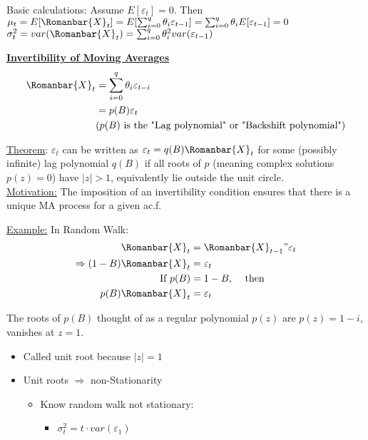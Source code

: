 Basic calculations: Assume $E[\varepsilon_t]=0$. Then $\mu_t=E[\Romanbar{X}_t]=E[\sum_{i=0}^q \theta_i \varepsilon_{t-1}]=\sum_{i=0}^q \theta_i E[\varepsilon_{t-1}]=0 $\\
$\sigma^2_t=var(\Romanbar{X}_t)=\sum_{i=0}^q \theta_i^2 var(\varepsilon_{t-1}) $

\bigskip
\textbf{\underline{Invertibility of Moving Averages}}
\begin{align*}
    \Romanbar{X}_t&= \sum_{i=0}^q \theta_i\varepsilon_{t-i}\\
    &=p(B)\varepsilon_t\\
    &\text{($p(B)$ is the "Lag polynomial" or "Backshift polynomial")}
\end{align*}

\underline{Theorem}: \quad $\varepsilon_t$ can be written as $\varepsilon_t=q(B)\Romanbar{X}_t$ for some (possibly infinite) lag polynomial $q(B)$ if all roots of $p$ (meaning complex solutions $p(z)=0$) have $|z|>1$, equivalently lie outside the unit circle. \\

\underline{Motivation:} \quad The imposition of an invertibility condition ensures that there is a unique MA process for a given ac.f.

\underline{Example:} \quad In Random Walk:
\begin{align*}
    \Romanbar{X}_t&=\Romanbar{X}_{t-1}"\varepsilon_t\\
    \Rightarrow (1-B)\Romanbar{X}_t&=\varepsilon_t\\
    \text{If } p(B) &= 1-B \text{, \quad then} \\
    p(B)\Romanbar{X}_t&=\varepsilon_t
\end{align*}

The roots of $p(B)$ thought of as a regular polynomial $p(z)$ are $p(z)=1-i$, vanishes at $z=1$.
\begin{itemize}
    \item Called unit root because $|z|=1$
    \item Unit roots $\Rightarrow$ non-Stationarity
    \begin{itemize}
        \item[] Know random walk not stationary:
        \begin{itemize}
            \item[] $\sigma^2_t=t \cdot var(\varepsilon_1)$
        \end{itemize}
    \end{itemize}
\end{itemize}

